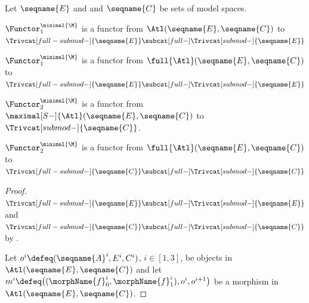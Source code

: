 \documentclass{article}
\begin{document}
\begin{theorem}
\label{the:M-isfunc}
Let $\seqname{E}$ and and $\seqname{C}$ be sets of model spaces.

$\Functor^{\minimal{\M}}_1$ is a functor from
$\Atl(\seqname{E}, \seqname{C})$ to
$
  \Trivcat[full-submod-]{\seqname{E}}  \subcat[full-]
  \Trivcat[submod-]{\seqname{E}}
$

$\Functor^{\minimal{\M}}_1$ is a functor from
$\full{\Atl}(\seqname{E}, \seqname{C})$ to
$
  \Trivcat[full-submod-]{\seqname{E}} \subcat[full-]
  \Trivcat[submod-]{\seqname{E}}
$

$\Functor^{\minimal{\M}}_2$ is a functor from
$\maximal[S-]{\Atl}(\seqname{E}, \seqname{C})$ to
$\Trivcat[submod-]{\seqname{C}}$.

$\Functor^{\minimal{\M}}_2$ is a functor from
$\full{\Atl}(\seqname{E}, \seqname{C})$ to
$
  \Trivcat[full-submod-]{\seqname{C}} \subcat[full-]
  \Trivcat[submod-]{\seqname{C}}
$

\begin{proof}
$
  \Trivcat[full-submod-]{\seqname{E}}  \subcat[full-]
  \Trivcat[submod-]{\seqname{E}}
$
and
$
  \Trivcat[full-submod-]{\seqname{C}} \subcat[full-]
  \Trivcat[submod-]{\seqname{C}}
$
by .

Let $o^i \defeq (\seqname{A}^i, E^i, C^i)$, $i \in [1,3]$, be
objects in $\Atl(\seqname{E}, \seqname{C})$
and let \\
$
m^i \defeq
  \bigl (
    (\morphName{f}^i_0, \morphName{f}^i_1),
    o^i,
    o^{i+1}
  \bigr )
$
be a morphism in $\Atl(\seqname{E}, \seqname{C})$.


\end{proof}
\end{theorem}
\end{document}
